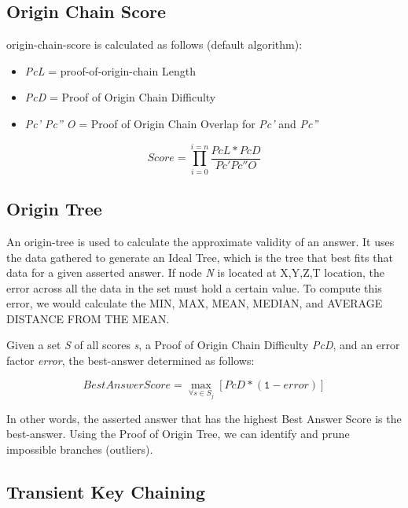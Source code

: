 \documentclass{article}
\begin{document}
\subsection {Origin Chain Score}
\Gls{origin-chain-score} is calculated as follows (default algorithm):

\begin{itemize}
\item \textit{PcL} = \Gls{proof-of-origin-chain} Length
\item \textit{PcD} = Proof of Origin Chain Difficulty
\item \textit{Pc' Pc'' O} = Proof of Origin Chain Overlap for \textit{Pc'} and \textit{Pc''}
\end{itemize}

\begin{equation*}\tag{1} \label{eq1}
Score = \prod_{i=0}^{i=n} \frac{PcL*PcD}{Pc' Pc'' O}
\end{equation*}

\subsection {Origin Tree}
An \Gls{origin-tree} is used to calculate the approximate validity of an answer. It uses the data gathered to generate an Ideal Tree, which is the tree that best fits that data for a given asserted answer. If node \textit{N} is located at X,Y,Z,T location, the error across all the data in the set must hold a certain value. To compute this error, we would calculate the MIN, MAX, MEAN, MEDIAN, and AVERAGE DISTANCE FROM THE MEAN.

Given a set \textit{S} of all scores \textit{s}, a Proof of Origin Chain Difficulty \textit{PcD}, and an error factor \textit{error}, the \Gls{best-answer} determined as follows:

\begin{equation*}\tag{2} \label{eq2}
Best Answer Score = \max_{\forall s \in S_j}[PcD * (\texttt{1} - error)]
\end{equation*}

In other words, the asserted answer that has the highest Best Answer Score is the \Gls{best-answer}. Using the Proof of Origin Tree, we can identify and prune impossible branches (outliers).

\subsection{Transient Key Chaining}
\end{document}
